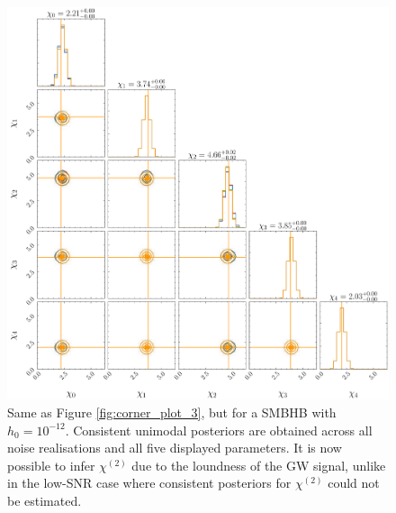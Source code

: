 \documentclass[fleqn,usenatbib,useAMS]{mnras}
\begin{document}
\begin{figure}
	\includegraphics[width=\columnwidth, height = \columnwidth ]{images/corner_highSNR_chi} 	
	\caption{Same as Figure \ref{fig:corner_plot_3}, but for a SMBHB with $h_0 = 10^{-12}$.  Consistent unimodal posteriors are obtained across all noise realisations and all five displayed parameters. It is now possible to infer $\chi^{(2)}$ due to the loundness of the GW signal, unlike in the low-SNR case where consistent posteriors for $\chi^{(2)}$ could not be estimated.}
	\label{fig:corner_high_snr_appendix_chi}
\end{figure}
\end{document}
